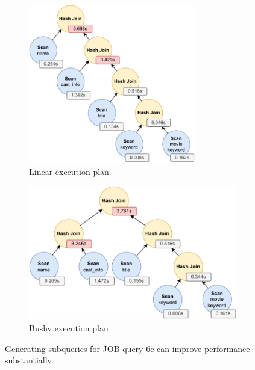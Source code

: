 \begin{figure}[tb]
	\centering
	\begin{subfigure}[b]{0.47\textwidth}
	    \centering
	    \includegraphics[width=0.8\textwidth]{figures/subquery-example-job-6c-linear.pdf}
	    \caption{Linear execution plan.}
	    \label{fig:subquery-results-linear}
	\end{subfigure}
	\begin{subfigure}[b]{0.47\textwidth}
	    \centering
	    \includegraphics[width=\textwidth]{figures/subquery-example-job-6c-subqueries.pdf}
	    \caption{Bushy execution plan}
	    \label{fig:subquery-results-bushy}
	\end{subfigure}
	\caption{Generating subqueries for JOB query 6c can improve performance substantially.}
	\label{fig:subquery-results}
\end{figure}

